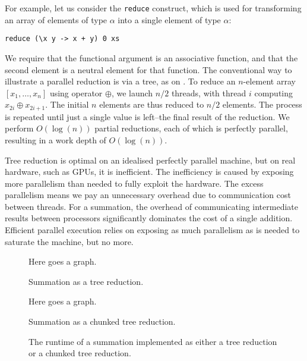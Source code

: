 For example, let us consider the \lstinline{reduce} construct, which
is used for transforming an array of elements of type $\alpha$ into a
single element of type $\alpha$:

\begin{lstlisting}
reduce (\x y -> x + y) 0 xs
\end{lstlisting}

We require that the functional argument is an associative function,
and that the second element is a neutral element for that function.
The conventional way to illustrate a parallel reduction is via a tree,
as on .  To reduce an $n$-element array
$[x_{1},\ldots,x_{n}]$ using operator $\oplus$, we launch $n/2$
threads, with thread $i$ computing $x_{2i}\oplus{}x_{2i+1}$.  The
initial $n$ elements are thus reduced to $n/2$ elements.  The process
is repeated until just a single value is left--the final result of the
reduction.  We perform $O(\log(n))$ partial reductions, each of which
is perfectly parallel, resulting in a work depth of
$O(\log(n))$.

Tree reduction is optimal on an idealised perfectly parallel machine,
but on real hardware, such as GPUs, it is inefficient.  The
inefficiency is caused by exposing more parallelism than needed to
fully exploit the hardware.  The excess parallelism means we pay an
unnecessary overhead due to communication cost between threads.  For a
summation, the overhead of communicating intermediate results between
processors significantly dominates the cost of a single addition.
Efficient parallel execution relies on exposing as much parallelism as
is needed to saturate the machine, but no more.

\begin{figure*}
  \centering
  Here goes a graph.
  \caption{Summation as a tree reduction.}
  \label{fig:tree-summation}
\end{figure*}

\begin{figure*}
  \centering
  Here goes a graph.
  \caption{Summation as a chunked tree reduction.}
  \label{fig:chunked-summation}
\end{figure*}

\begin{figure*}
  \centering
  
  \caption{The runtime of a summation implemented as either a tree reduction or a chunked tree reduction.}
  \label{fig:tree-vs-chunked}
\end{figure*}

